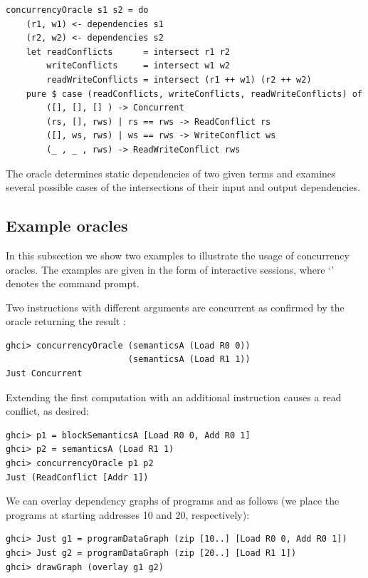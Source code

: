\begin{verbatim}
concurrencyOracle s1 s2 = do
    (r1, w1) <- dependencies s1
    (r2, w2) <- dependencies s2
    let readConflicts      = intersect r1 r2
        writeConflicts     = intersect w1 w2
        readWriteConflicts = intersect (r1 ++ w1) (r2 ++ w2)
    pure $ case (readConflicts, writeConflicts, readWriteConflicts) of
        ([], [], [] ) -> Concurrent
        (rs, [], rws) | rs == rws -> ReadConflict rs
        ([], ws, rws) | ws == rws -> WriteConflict ws
        (_ , _ , rws) -> ReadWriteConflict rws
\end{verbatim}

The oracle determines static dependencies of two given terms and examines
several possible cases of the intersections of their input and output
dependencies.

\subsection{Example oracles}

In this subsection we show two examples to illustrate the usage of concurrency
oracles. The examples are given in the form of interactive sessions, where
`' denotes the command prompt.

Two  instructions with different arguments are concurrent as confirmed
by the oracle returning the result :

\begin{verbatim}
ghci> concurrencyOracle (semanticsA (Load R0 0))
                        (semanticsA (Load R1 1))
Just Concurrent
\end{verbatim}

\noindent
Extending the first computation with an additional  instruction causes
a read conflict, as desired:
\begin{verbatim}
ghci> p1 = blockSemanticsA [Load R0 0, Add R0 1]
ghci> p2 = semanticsA (Load R1 1)
ghci> concurrencyOracle p1 p2
Just (ReadConflict [Addr 1])
\end{verbatim}

\noindent
We can overlay dependency graphs of programs  and  as follows (we
place the programs at starting addresses 10 and 20, respectively):

\begin{verbatim}
ghci> Just g1 = programDataGraph (zip [10..] [Load R0 0, Add R0 1])
ghci> Just g2 = programDataGraph (zip [20..] [Load R1 1])
ghci> drawGraph (overlay g1 g2)
\end{verbatim}


